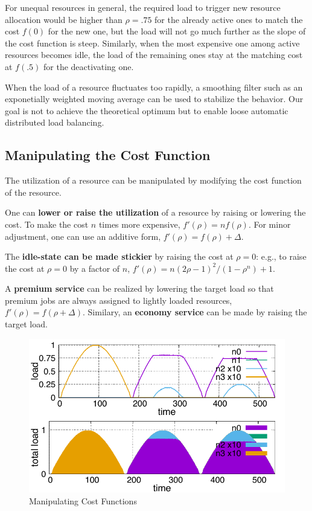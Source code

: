 For unequal resources in general, the required load to trigger new
resource allocation would be higher than $\rho = .75$ for the already
active ones to match the cost $f(0)$ for the new one, but the load
will not go much further as the slope of the cost function is steep.
Similarly, when the most expensive one among active resources becomes
idle, the load of the remaining ones stay at the matching cost at
$f(.5)$ for the deactivating one.

When the load of a resource fluctuates too rapidly,
a smoothing filter such as an exponetially weighted moving average
can be used to stabilize the behavior.
Our goal is not to achieve the theoretical optimum but to
enable loose automatic distributed load balancing.

\subsection{Manipulating the Cost Function}
\label{sec:variation}

The utilization of a resource can be manipulated by modifying the cost
function of the resource.

One can {\bf lower or raise the utilization} of a resource by raising or
lowering the cost.
To make the cost $n$ times more expensive, $f'(\rho) = n f(\rho)$.
For minor adjustment, one can use an additive form,
$f'(\rho) = f(\rho) + \Delta$.

The {\bf idle-state can be made stickier} by raising the cost at $\rho = 0$:
e.g., to raise the cost at $\rho = 0$ by a factor of $n$,
$f'(\rho) = n (2\rho - 1)^{2}/(1 - \rho^{n}) + 1$.

A {\bf premium service} can be realized by lowering the target load so
that premium jobs are always assigned to lightly loaded resources, 
$f'(\rho) = f(\rho + \Delta)$.
Similary, an {\bf economy service} can be made by raising the target
load.

\begin{figure}[tb]
  \begin{center}
    \includegraphics[width=1.0\columnwidth]{lowering.pdf}
    \vspace{-2.0ex}
    \caption{Manipulating Cost Functions}
    \label{fig:lowering}
  \end{center}
\end{figure}

